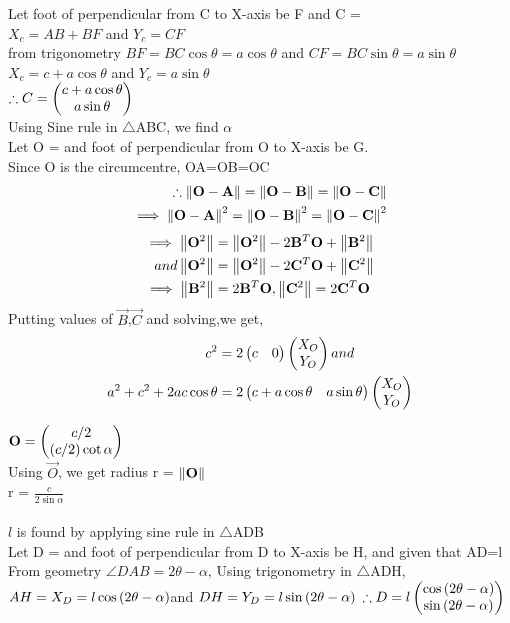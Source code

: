 \documentclass[journal,12pt,twocolumn]{IEEEtran}
\renewcommand\thesection{\arabic{section}}
\begin{document}
\begin{enumerate}[label=\thesection.\arabic*.,ref=\thesection.\theenumi]
Let foot of perpendicular from C to X-axis be F and C = \\
$X_c=AB+BF$ and $Y_c = CF$\\
from trigonometry $BF = BC\cos \theta = a\cos \theta$ and $CF = BC\sin \theta = a\sin \theta$ \\
$X_c = c + a\cos \theta$ and $Y_c = a\sin \theta$ \\ 
$\therefore C = \begin{pmatrix}c + a\cos \theta \\ a\sin \theta\end{pmatrix} $\\
Using Sine rule in $\bigtriangleup$ABC, we find $\alpha$\\
Let O =  and foot of perpendicular from O to X-axis be G.\\
Since O is the circumcentre, OA=OB=OC\\
\begin{align}
\therefore \left\lVert\mathbf{O} - \mathbf{A}\right\rVert = \left\lVert\mathbf{O} - \mathbf{B}\right\rVert = \left\lVert\mathbf{O} - \mathbf{C}\right\rVert\\
\implies \left\lVert\mathbf{O} - \mathbf{A}\right\rVert^{2} = \left\lVert\mathbf{O} - \mathbf{B}\right\rVert^{2} = \left\lVert\mathbf{O} - \mathbf{C}\right\rVert^{2}
\end{align}
\begin{align}
\implies \left\lVert\mathbf{O}^{2}\right\rVert &= \left\lVert\mathbf{O}^{2}\right\rVert - 2\mathbf{B}^{T}\mathbf{O} + \left\lVert\mathbf{B}^{2}\right\rVert\\ 
and \left\lVert\mathbf{O}^{2}\right\rVert &= \left\lVert\mathbf{O}^{2}\right\rVert - 2\mathbf{C}^{T}\mathbf{O} + \left\lVert\mathbf{C}^{2}\right\rVert\\
\implies \left\lVert\mathbf{B}^{2}\right\rVert &= 2\mathbf{B}^{T}\mathbf{O}, \left\lVert\mathbf{C}^{2}\right\rVert = 2\mathbf{C}^{T}\mathbf{O}
\end{align}
Putting values of $\vec{B}$,$\vec{C}$ and solving,we get,\\
\begin{align}
c^{2}&=2\begin{pmatrix}c & 0\end{pmatrix}\begin{pmatrix}X_O \\ Y_O\end{pmatrix} and \\
a^{2}+c^{2}+2ac\cos \theta&=2\begin{pmatrix}c + a\cos \theta & a\sin \theta\end{pmatrix}\begin{pmatrix}X_O \\ Y_O\end{pmatrix}
\end{align}

$\mathbf{O} = \begin{pmatrix}c/2 \\ \left(c/2\right) \cot \alpha\end{pmatrix} $ \\
Using $\vec{O}$, we get radius r = $\left\lVert\mathbf{O}\right\rVert$\\
r = $\frac{c}{2\sin \alpha}$\\
\\
$l$ is found by applying sine rule in $\bigtriangleup$ADB\\
Let D =  and foot of perpendicular from D to X-axis be H,
and given that AD=l\\
From geometry $\angle DAB = 2\theta-\alpha$,
Using trigonometry in $\bigtriangleup$ADH, 
$AH=X_D=l\cos \left(2\theta-\alpha\right)$and $DH=Y_D=l\sin \left(2\theta-\alpha\right)$
$\therefore D = l\begin{pmatrix}\cos \left(2\theta-\alpha\right) \\ \sin \left(2\theta-\alpha\right)\end{pmatrix} $\\
\\


\end{enumerate}
\end{document}
